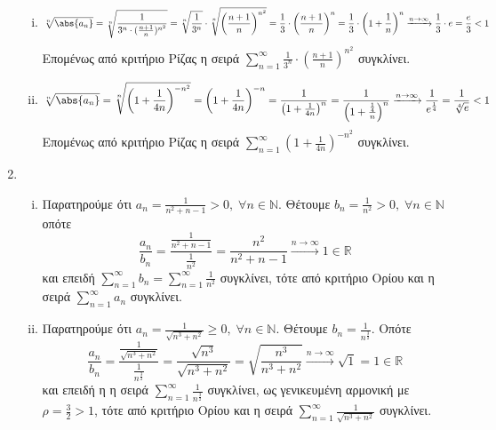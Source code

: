 \documentclass[a4paper,table]{report}
\begin{document}
\begin{enumerate}
\begin{enumerate}[i)]
      \item 
        \[
          \sqrt[n]{\abs{a_{n}}} = \sqrt[n]{\frac{1}{3^{n} 
          \cdot (\frac{n+1}{n})^{n^{2}}}} = \sqrt[n]{\frac{1}{3^{n}}} 
          \cdot \sqrt[n]{\left(\frac{n+1}{n} \right)^{n^{2}}} = 
          \frac{1}{3} \cdot \left(\frac{n+1}{n} \right)^{n} = \frac{1}{3} 
          \cdot \left(1+ \frac{1}{n} \right)^{n} \xrightarrow{n \to \infty} 
          \frac{1}{3} \cdot e = \frac{e}{3} <1 
        \] 
        Επομένως από κριτήριο Ρίζας η σειρά 
        $ \sum_{n=1}^{\infty} \frac{1}{3^{n}} \cdot 
        \left(\frac{n+1}{n} \right)^{n^{2}} $ συγκλίνει.

      \item 
        \[
          \sqrt[n]{\abs{a_{n}}} = \sqrt[n]{\left(1+ \frac{1}{4n} 
          \right)^{-n^{2}}} = \left(1+ \frac{1}{4n} \right)^{-n} = 
          \frac{1}{\left(1+ \frac{1}{4n} \right)^{n}} = 
          \frac{1}{\left(1 + \frac{\frac{1}{4}}{n}\right)^{n}} 
          \xrightarrow{n \to \infty} \frac{1}{e ^{\frac{1}{4}}} = 
          \frac{1}{\sqrt[4]{e}} <1 
        \] 
        Επομένως από κριτήριο Ρίζας η σειρά 
        $ \sum_{n=1}^{\infty} \left(1+ \frac{1}{4n} \right)^{-n^{2}} $ συγκλίνει.
    \end{enumerate}

  \item 
    \begin{enumerate}[i)]
      \item Παρατηρούμε ότι $ a_{n}= \frac{1}{n^{2}+n-1} > 0, 
        \; \forall n \in \mathbb{N}$. Θέτουμε 
        $
        b_{n} = \frac{1}{n^{2}} > 0, \; \forall n \in \mathbb{N} 
        $ οπότε
        \[
          \frac{a_{n}}{b_{n}} = \frac{\frac{1}{n^{2}+n-1}}{\frac{1}{n^{2}}} = 
          \frac{n^{2}}{n^{2}+n-1} \xrightarrow{n \to \infty} 1 \in \mathbb{R} 
        \] 
        και επειδή $ \sum_{n=1}^{\infty} b_{n} = \sum_{n=1}^{\infty} 
        \frac{1}{n^{2}} $ συγκλίνει, τότε από κριτήριο Ορίου και η σειρά 
        $ \sum_{n=1}^{\infty} a_{n} $ συγκλίνει.


      \item Παρατηρούμε ότι $ a_{n}= \frac{1}{\sqrt{n^{3}+n^{2}}} \geq 0, 
        \; \forall n \in \mathbb{N}$. Θέτουμε $ b_{n} = \frac{1}{n^{\frac{3}{2}}} $.
        Οπότε
        \[
          \frac{a_{n}}{b_{n}} =
          \frac{\frac{1}{\sqrt{n^{3}+n^{2}}}}{\frac{1}{n^{\frac{3}{2}}}} = 
          \frac{\sqrt{n^{3}}}{\sqrt{n^{3}+n^{2}}} = 
          \sqrt{\frac{n^{3}}{n^{3}+n^{2}}}
          \xrightarrow{n \to \infty} \sqrt{1}=1 \in \mathbb{R} 
        \] 
        και επειδή η η σειρά $ \sum_{n=1}^{\infty} \frac{1}{n^{\frac{3}{2}}} $ 
        συγκλίνει, ως γενικευμένη αρμονική με $ \rho = \frac{3}{2} >1 $, τότε 
        από κριτήριο Ορίου και η σειρά $ \sum_{n=1}^{\infty} 
        \frac{1}{\sqrt{n^{3}+n^{2}} } $ συγκλίνει.


\end{enumerate}
\end{enumerate}
\end{document}
